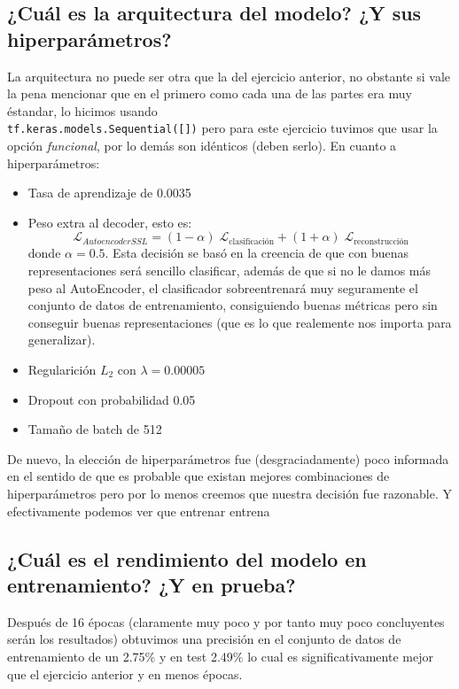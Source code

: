 \documentclass{article}
\begin{document}
\subsection{¿Cuál es la arquitectura del modelo? ¿Y sus hiperparámetros?}
La arquitectura no puede ser otra que la del ejercicio anterior, no obstante si vale la pena mencionar que en el primero como cada una de las partes era muy éstandar, lo hicimos usando\\
\noindent\texttt{tf.keras.models.Sequential([])} pero para este ejercicio tuvimos que usar la opción \emph{funcional}, por lo demás son idénticos (deben serlo). En cuanto a hiperparámetros:
\begin{itemize}
    \item Tasa de aprendizaje de 0.0035
    \item Peso extra al decoder, esto es: \[ \mathcal{L}_{AutoencoderSSL} = (1-\alpha) \; \mathcal{L}_{\text{clasificación}} + (1+\alpha)\; \mathcal{L}_{\text{reconstrucción}} \] donde $\alpha = 0.5$. Esta decisión se basó en la creencia de que con buenas representaciones será sencillo clasificar, además de que si no le damos más peso al AutoEncoder, el clasificador sobreentrenará muy seguramente el conjunto de datos de entrenamiento, consiguiendo buenas métricas pero sin conseguir buenas representaciones (que es lo que realemente nos importa para generalizar).
    \item Regularición $L_{2}$ con $\lambda = 0.00005$
    \item Dropout con probabilidad 0.05
    \item Tamaño de batch de 512  
\end{itemize}

De nuevo, la elección de hiperparámetros fue (desgraciadamente) poco informada en el sentido de que es probable que existan mejores combinaciones de hiperparámetros pero por lo menos creemos que nuestra decisión fue razonable. Y efectivamente podemos ver que entrenar entrena
\subsection{¿Cuál es el rendimiento del modelo en entrenamiento? ¿Y en prueba?}
Después de 16 épocas (claramente muy poco y por tanto muy poco concluyentes serán los resultados) obtuvimos una precisión en el conjunto de datos de entrenamiento de un 2.75\% y en test 2.49\% lo cual es significativamente mejor que el ejercicio anterior y en menos épocas.
\end{document}
